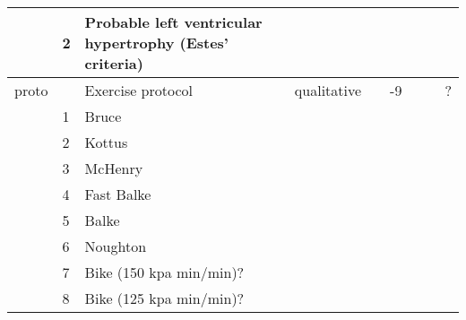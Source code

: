 \documentclass[a4paper,12pt]{article}
\begin{document}
\begin{adjustbox}{width=1\textwidth}
\begin{tabular}{|l|l|l|l|l|l|l|l|l|}
              & 2                  & Probable left ventricular hypertrophy (Estes' criteria)    &              &                        &                      &                                       &               &              \\ \hline
proto         &                    & Exercise protocol                                          & qualitative  &                        & -9                   &                                       &               & ?            \\ \hline
              & 1                  & Bruce                                                      &              &                        &                      &                                       &               &              \\ \hline
              & 2                  & Kottus                                                     &              &                        &                      &                                       &               &              \\ \hline
              & 3                  & McHenry                                                    &              &                        &                      &                                       &               &              \\ \hline
              & 4                  & Fast Balke                                                 &              &                        &                      &                                       &               &              \\ \hline
              & 5                  & Balke                                                      &              &                        &                      &                                       &               &              \\ \hline
              & 6                  & Noughton                                                   &              &                        &                      &                                       &               &              \\ \hline
              & 7                  & Bike (150 kpa min/min)?                                    &              &                        &                      &                                       &               &              \\ \hline
              & 8                  & Bike (125 kpa min/min)?                                    &              &                        &                      &                                       &               &              \\ \hline

\end{tabular}
\end{adjustbox}
\end{document}
